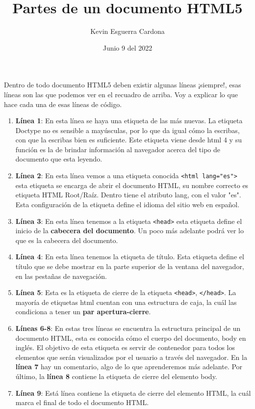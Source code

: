 \documentclass[12pt, letterpaper]{article}
\title{Partes de un documento HTML5}
\author{Kevin Esguerra Cardona}
\date{Junio 9 del 2022}
\begin{document}
\maketitle



Dentro de todo documento HTML5 deben existir algunas líneas ¡siempre!, esas líneas son las que podemos ver en el recuadro de arriba. Voy a explicar lo que hace cada una de esas
líneas de código. 

\begin{enumerate}
    \item \textbf{Línea 1}: En esta línea se haya una etiqueta de las más nuevas. La etiqueta Doctype no es sensible a mayúsculas, por lo que da igual cómo la escribas, con que
    la escribas bien es suficiente. Este etiqueta viene desde html 4 y su función es la de brindar información al navegador acerca del tipo de documento que esta leyendo.
    \item \textbf{Línea 2}: En esta línea vemos a una etiqueta conocida \newline \verb|<html lang="es">| \newline esta etiqueta se encarga de abrir el documento HTML, su nombre correcto es etiqueta 
    HTML Root/Raíz. Dentro tiene el atributo lang, con el valor "es". Esta configuración de 
    la etiqueta define el idioma del sitio web en español.
    \item \textbf{Línea 3}: En esta línea tenemos a la etiqueta \verb|<head>| esta etiqueta define el inicio de la \textbf{cabecera del documento}. Un poco más adelante podrá ver lo 
    que es la cabecera del documento.
    \item \textbf{Línea 4}: En esta línea tenemos la etiqueta de título. Esta etiqueta define el título que se debe mostrar en la parte superior de la ventana del navegador, 
    en las pestañas de navegación.
    \item \textbf{Línea 5}: Esta es la etiqueta de cierre de la etiqueta \verb|<head>|, \verb|</head>|. La mayoría de etiquetas html cuentan con una estructura de caja, la cuál las condiciona a tener
    un \textbf{par apertura-cierre}.
    \item \textbf{Líneas 6-8}: En estas tres líneas se encuentra la estructura principal de un documento HTML, esta es conocida cómo el cuerpo del documento, body en inglés. El objetivo de esta etiqueta
    es servir de contenedor para todos los elementos que serán visualizados por el usuario a través del navegador. En la \textbf{línea 7} hay un comentario, algo de lo que aprenderemos más adelante. Por
    último, la \textbf{línea 8} contiene la etiqueta de cierre del elemento body.
    \item \textbf{Línea 9}: Está línea contiene la etiqueta de cierre del elemento HTML, la cuál marca el final de todo el documento HTML.
\end{enumerate}
\end{document}
